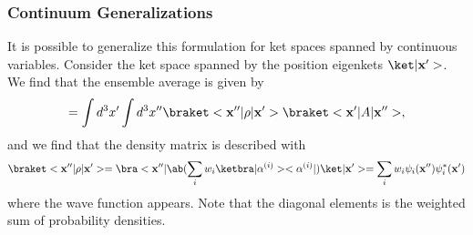 \subsubsection{Continuum Generalizations}
It is possible to generalize this formulation for ket spaces spanned by continuous variables. Consider the ket space spanned by the position eigenkets $\k{\vec{x}'}$. We find that the ensemble average is given by 
\begin{equation}
    [A] = \int d^3 x' \int d^3 x''\bkop{\vec{x}''}{\rho}{\vec{x}'}\bkop{\vec{x}'}{A}{\vec{x}''},
\end{equation}
and we find that the density matrix is described with
\begin{equation}
    \bkop{\vec{x}''}{\rho}{\vec{x}'} = \b{\vec{x}''} \ab (\sum_i w_i \kb{\alpha^{(i)}}{\alpha^{(i)}})\k{\vec{x}'} = \sum_i w_i \psi_i(\vec{x}'')\psi_i^*(\vec{x}')
\end{equation}
where the wave function appears. Note that the diagonal elements is the weighted sum of probability densities.

